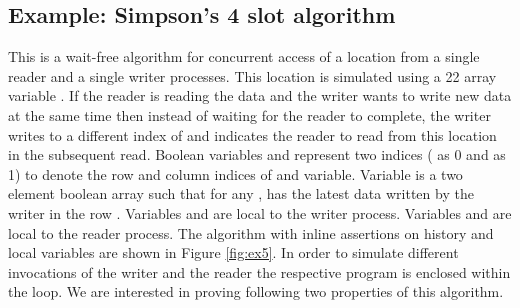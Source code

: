\subsection{Example: Simpson's 4 slot algorithm \cite{Simpson4slot}}
This is a wait-free algorithm for concurrent access of a location from a single reader and a single writer processes. This location is 
simulated using a 22 array variable . If the
reader is reading the data and the writer wants to write new data at the same time then 
instead of waiting for the reader to complete, the writer writes to a different index of  and 
indicates the reader to read from this location in the subsequent read. 
Boolean variables  and  represent two indices ( as 0 and  as 1) to denote the row and column 
indices of  and  variable. Variable  is a two element boolean array such that for any , 
 has the latest data written by the writer in the row . Variables  and  are local to the writer process. 
Variables  and  are local to the reader process. The algorithm with inline assertions 
on history and local variables are shown in Figure \ref{fig:ex5}. In order to simulate different invocations of the writer and the reader 
the respective program is enclosed within the loop. We are interested in proving following two properties of this algorithm.

\FigureExV	


